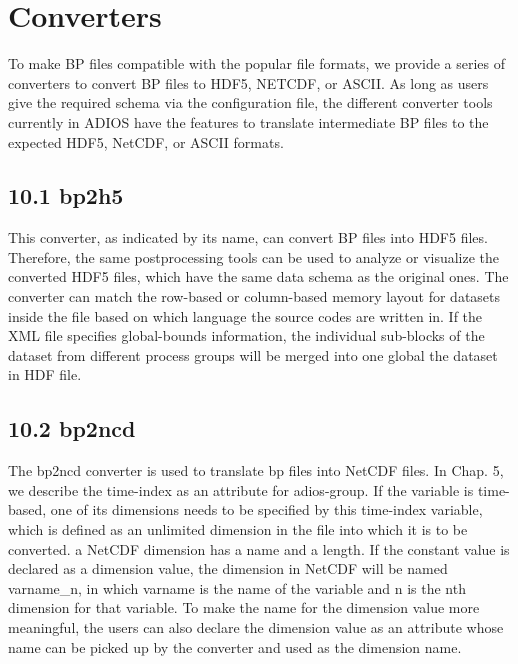 \vspace{34pt}
\section{Converters}

\vspace{24pt}
\leftskip=0pt
To make BP files compatible with the popular file formats, we provide a series 
of converters to convert BP files to HDF5, NETCDF, or ASCII. As long as users give 
the required schema via the configuration file, the different converter tools currently 
in ADIOS have the features to translate intermediate BP files to the expected HDF5, 
NetCDF, or ASCII formats.\label{HToc82067530}

\vspace{24pt}
\subsection*{{\large 10.1 }{\large \textbf{ \label{HToc84890282}\label{HToc212016658}\label{HToc212016900}\label{HToc182553431}bp2h5}}}

\vspace{10pt}
This converter, as indicated by its name, can convert BP files into HDF5 files. 
Therefore, the same postprocessing tools can be used to analyze or visualize the 
converted HDF5 files, which have the same data schema as the original ones. The 
converter can match the row-based or column-based memory layout for datasets inside 
the file based on which language the source codes are written in.  If the XML file 
specifies global-bounds information, the individual sub-blocks of the dataset from 
different process groups will be merged into one global the dataset in HDF file.\label{HToc82067531}

\vspace{10pt}
\subsection*{{\large 10.2 }{\large \textbf{ \label{HToc84890283}\label{HToc212016659}\label{HToc212016901}\label{HToc182553432}bp2ncd}}}

\vspace{10pt}
The bp2ncd converter is used to translate bp files into NetCDF files. In Chap. 
5, we describe the time-index as an attribute for adios-group. If the variable 
is time-based, one of its dimensions needs to be specified by this time-index variable, 
which is defined as an unlimited dimension in the file into which it is to be converted. 
a NetCDF dimension has a name and a length. If the constant value is declared as 
a dimension value, the dimension in NetCDF will be named varname\_n, in which varname 
is the name of the variable and n is the nth dimension for that variable. To make 
the name for the dimension value more meaningful, the users can also declare the 
dimension value as an attribute whose name can be picked up by the converter and 
used as the dimension name.

